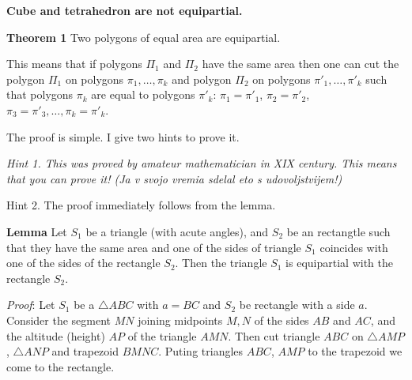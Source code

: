 \def\vare {\varepsilon}
\def\A {{\bf A}}
\def\t {\tilde}
\def\a {\alpha}
\def\K {{\bf K}}
\def\N {{\bf N}}
\def\V {{\cal V}}
\def\s {{\sigma}}
\def\S {{\Sigma}}
\def\s {{\sigma}}
\def\p{\partial}
\def\vare{{\varepsilon}}
\def\Q {{\bf Q}}
\def\D {{\cal D}}
\def\G {{\Gamma}}
\def\C {{\bf C}}
\def\M {{\cal M}}
\def\Z {{\bf Z}}
\def\U  {{\cal U}}
\def\H {{\cal H}}
\def\R  {{\bf R}}
\def\S  {{\bf S}}
\def\E  {{\bf E}}
\def\l {\lambda}
\def\degree {{\bf {\rm degree}\,\,}}
\def \finish {${\,\,\vrule height1mm depth2mm width 8pt}$}
\def \m {\medskip}
\def\p {\partial}
\def\r {{\bf r}}
\def\v {{\bf v}}
\def\n {{\bf n}}
\def\t {{\bf t}}
\def\b {{\bf b}}
\def\c {{\bf c }}
\def\e{{\bf e}}
\def\ac {{\bf a}}
\def \X   {{\bf X}}
\def \Y   {{\bf Y}}
\def \x   {{\bf x}}
\def \y   {{\bf y}}
\def \G{{\cal G}}

\centerline {\bf Cube and tetrahedron are not equipartial.}

  \bigskip

   {\bf Theorem 1} Two polygons of equal area
   are equipartial.

    This means that if polygons $\Pi_1$ and $\Pi_2$ have the same area then one can cut
     the polygon $\Pi_1$ on polygons $\pi_1,\dots,\pi_k$ and
     polygon  $\Pi_2$ on polygons $\pi'_1,\dots,\pi'_k$ such that polygons $\pi_k$
     are equal to polygons $\pi'_k$: $\pi_1=\pi'_1$,  $\pi_2=\pi'_2$, $\pi_3=\pi'_3,\dots, \pi_k=\pi'_k$.





  The proof is simple.   I give two hints to prove it.

\m

   {\it Hint 1. This was proved by amateur mathematician in XIX century.   This means
    that you can prove it! (Ja v svojo vremia  sdelal eto s udovoljstvijem!)}

    Hint 2. The proof immediately follows from the lemma.

\m

   {\bf Lemma}  Let $S_1$ be a triangle (with acute angles), and $S_2$ be an rectangtle
   such that they have the same area
      and one of the sides of triangle $S_1$ coincides with one of the sides of the rectangle  $S_2$.
     Then the triangle $S_1$ is equipartial with the rectangle $S_2$.

     {\it Proof}: Let $S_1$ be a $\triangle ABC$ with $a=BC$ and $S_2$ be rectangle with a side $a$.
      Consider the segment $MN$ joining midpoints $M,N$ of the sides $AB$ and $AC$,
      and the altitude (height) $AP$ of the triangle $AMN$. Then cut triangle $ABC$
      on $\triangle AMP$, $\triangle ANP$ and trapezoid $BMNC$. Puting triangles
      $ABC$, $AMP$ to the trapezoid we come to the rectangle.

